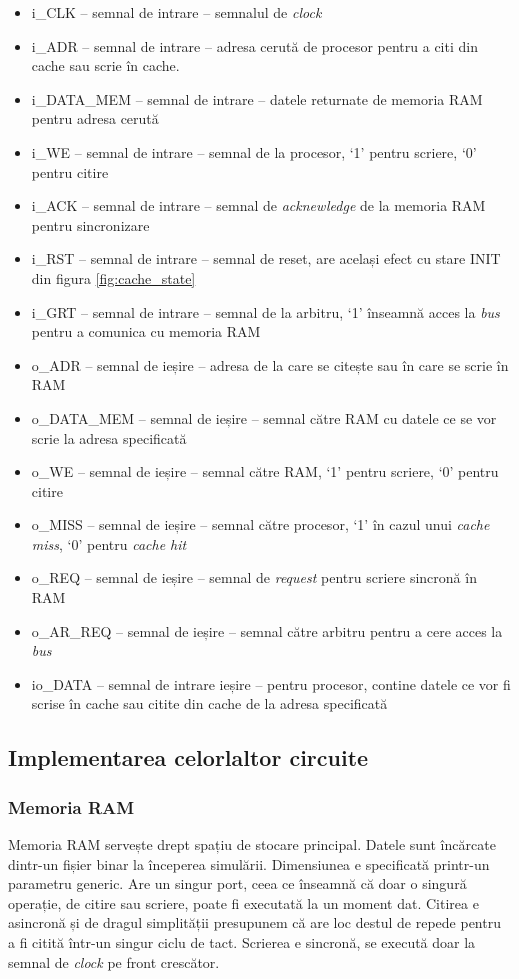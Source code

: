 \documentclass[../main.tex]{subfiles}
\begin{document}
\begin{itemize}
    \item i\_CLK -- semnal de intrare -- semnalul de \emph{clock}
    \item i\_ADR -- semnal de intrare -- adresa cerută de procesor pentru a citi din cache sau scrie în cache.
    \item i\_DATA\_MEM -- semnal de intrare -- datele returnate de memoria RAM pentru adresa cerută
    \item i\_WE -- semnal de intrare -- semnal de la procesor, `1' pentru scriere, `0' pentru citire
    \item i\_ACK -- semnal de intrare -- semnal de \emph{acknewledge} de la memoria RAM pentru sincronizare 
    \item i\_RST -- semnal de intrare -- semnal de reset, are același efect cu stare INIT din figura \ref{fig:cache_state}
    \item i\_GRT -- semnal de intrare -- semnal de la arbitru, `1' înseamnă acces la \emph{bus} pentru a comunica cu memoria RAM
    \item o\_ADR -- semnal de ieșire -- adresa de la care se citește sau în care se scrie în RAM
    \item o\_DATA\_MEM -- semnal de ieșire -- semnal către RAM cu datele ce se vor scrie la adresa specificată
    \item o\_WE -- semnal de ieșire -- semnal către RAM, `1' pentru scriere, `0' pentru citire
    \item o\_MISS -- semnal de ieșire -- semnal către procesor, `1' în cazul unui \emph{cache miss}, `0' pentru \emph{cache hit}
    \item o\_REQ -- semnal de ieșire -- semnal de \emph{request} pentru scriere sincronă în RAM
    \item o\_AR\_REQ -- semnal de ieșire -- semnal către arbitru pentru a cere acces la \emph{bus}
    \item io\_DATA -- semnal de intrare ieșire -- pentru procesor, contine datele ce vor fi scrise în cache sau citite din 
    cache de la adresa specificată
\end{itemize}

\subsection{Implementarea celorlaltor circuite}
\subsubsection{Memoria RAM}
Memoria RAM servește drept spațiu de stocare principal. Datele sunt încărcate dintr-un fișier binar la începerea
simulării. Dimensiunea e specificată printr-un parametru generic. Are un singur port, ceea ce înseamnă că doar o
singură operație, de citire sau scriere, poate fi executată la un moment dat. Citirea e asincronă și de dragul
simplității presupunem că are loc destul de repede pentru a fi citită într-un singur ciclu de tact. Scrierea
e sincronă, se execută doar la semnal de \emph{clock} pe front crescător.
\end{document}
